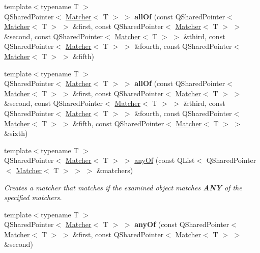 \begin{DoxyCompactItemize}
\item 
\hypertarget{namespace_hamcrest_qt_ade5face79ec28843e874d5838a6359a0}{{\footnotesize template$<$typename T $>$ }\\Q\-Shared\-Pointer$<$ \hyperlink{class_hamcrest_qt_1_1_matcher}{Matcher}$<$ T $>$ $>$ {\bfseries all\-Of} (const Q\-Shared\-Pointer$<$ \hyperlink{class_hamcrest_qt_1_1_matcher}{Matcher}$<$ T $>$ $>$ \&first, const Q\-Shared\-Pointer$<$ \hyperlink{class_hamcrest_qt_1_1_matcher}{Matcher}$<$ T $>$ $>$ \&second, const Q\-Shared\-Pointer$<$ \hyperlink{class_hamcrest_qt_1_1_matcher}{Matcher}$<$ T $>$ $>$ \&third, const Q\-Shared\-Pointer$<$ \hyperlink{class_hamcrest_qt_1_1_matcher}{Matcher}$<$ T $>$ $>$ \&fourth, const Q\-Shared\-Pointer$<$ \hyperlink{class_hamcrest_qt_1_1_matcher}{Matcher}$<$ T $>$ $>$ \&fifth)}\label{namespace_hamcrest_qt_ade5face79ec28843e874d5838a6359a0}

\item 
\hypertarget{namespace_hamcrest_qt_a212acd440c9c1c5cfc353746658ef4ae}{{\footnotesize template$<$typename T $>$ }\\Q\-Shared\-Pointer$<$ \hyperlink{class_hamcrest_qt_1_1_matcher}{Matcher}$<$ T $>$ $>$ {\bfseries all\-Of} (const Q\-Shared\-Pointer$<$ \hyperlink{class_hamcrest_qt_1_1_matcher}{Matcher}$<$ T $>$ $>$ \&first, const Q\-Shared\-Pointer$<$ \hyperlink{class_hamcrest_qt_1_1_matcher}{Matcher}$<$ T $>$ $>$ \&second, const Q\-Shared\-Pointer$<$ \hyperlink{class_hamcrest_qt_1_1_matcher}{Matcher}$<$ T $>$ $>$ \&third, const Q\-Shared\-Pointer$<$ \hyperlink{class_hamcrest_qt_1_1_matcher}{Matcher}$<$ T $>$ $>$ \&fourth, const Q\-Shared\-Pointer$<$ \hyperlink{class_hamcrest_qt_1_1_matcher}{Matcher}$<$ T $>$ $>$ \&fifth, const Q\-Shared\-Pointer$<$ \hyperlink{class_hamcrest_qt_1_1_matcher}{Matcher}$<$ T $>$ $>$ \&sixth)}\label{namespace_hamcrest_qt_a212acd440c9c1c5cfc353746658ef4ae}

\item 
{\footnotesize template$<$typename T $>$ }\\Q\-Shared\-Pointer$<$ \hyperlink{class_hamcrest_qt_1_1_matcher}{Matcher}$<$ T $>$ $>$ \hyperlink{namespace_hamcrest_qt_a3bdc7acaf499318972b745c8a21b0fb6}{any\-Of} (const Q\-List$<$ Q\-Shared\-Pointer$<$ \hyperlink{class_hamcrest_qt_1_1_matcher}{Matcher}$<$ T $>$ $>$ $>$ \&matchers)
\begin{DoxyCompactList}\small\item\em Creates a matcher that matches if the examined object matches {\bfseries A\-N\-Y} of the specified matchers. \end{DoxyCompactList}\item 
\hypertarget{namespace_hamcrest_qt_a87fd234ca8afe8ef6881c7df105ee989}{{\footnotesize template$<$typename T $>$ }\\Q\-Shared\-Pointer$<$ \hyperlink{class_hamcrest_qt_1_1_matcher}{Matcher}$<$ T $>$ $>$ {\bfseries any\-Of} (const Q\-Shared\-Pointer$<$ \hyperlink{class_hamcrest_qt_1_1_matcher}{Matcher}$<$ T $>$ $>$ \&first, const Q\-Shared\-Pointer$<$ \hyperlink{class_hamcrest_qt_1_1_matcher}{Matcher}$<$ T $>$ $>$ \&second)}\label{namespace_hamcrest_qt_a87fd234ca8afe8ef6881c7df105ee989}


\end{DoxyCompactItemize}
